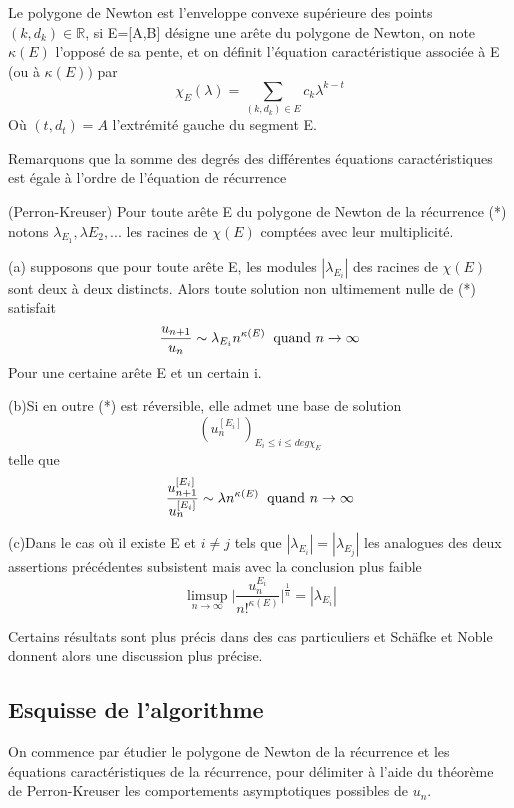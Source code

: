 \documentclass[a4paper,10.5pt]{article}
\begin{document}
	
	\begin{definition} Le polygone de Newton est l'enveloppe convexe supérieure des points $(k, d_{k}) \in \mathbb{R}$, si E=[A,B] désigne une arête du polygone de Newton, on note $\kappa(E)$ l'opposé de sa pente, et on définit l'équation caractéristique associée à E (ou à $\kappa(E))$ par
		\[\chi_{E}(\lambda)=\sum_{(k,d_{k}) \in E} c_{k}\lambda^{k-t}\]
		Où $(t,d_{t})=A$ l'extrémité gauche du segment E.
	\end{definition}
	
	Remarquons que la somme des degrés des différentes équations caractéristiques est égale à l'ordre de l'équation de récurrence 
	
	\begin{theorem} (Perron-Kreuser)
		Pour toute arête E du polygone de Newton de la récurrence (*) notons $\lambda_{E_{1}},\lambda{E_{2}},...$ les racines de $\chi(E)$ comptées avec leur multiplicité.
		
		(a) supposons que pour toute arête E, les modules $|\lambda_{E_{i}}|$ des racines de $\chi(E)$ sont deux à deux distincts. Alors toute solution non ultimement nulle de (*) satisfait
		\[\frac{u_{n+1}}{u_{n}}\sim \lambda_{E_{i}}n^{\kappa(E)} \hspace{2mm} \text{quand } n \rightarrow \infty\]
		Pour une certaine arête E et un certain i.
		
		(b)Si en outre (*) est réversible, elle admet une base de solution 
		\[(u_{n}^{[E_{i}]})_{E_{i}\leq i \leq deg \chi_{E}}\]
		telle que 
		\[\frac{u_{n+1}^{[E_{i}]}}{u_{n}^{[E_{i}]}}\sim \lambda n^{\kappa(E)} \hspace{2mm} \text{quand } n \rightarrow \infty\]
		
		(c)Dans le cas où il existe E et $i \neq j$ tels que $|\lambda_{E_{i}}|=|\lambda_{E_{j}}|$ les analogues des deux assertions précédentes subsistent mais avec la conclusion plus faible
		\[\limsup_{n \rightarrow \infty } \big|\frac{u_{n}^{E_{i}}}{n!^{\kappa(E)}}\big|^{\frac{1}{n}}=|\lambda_{E_{i}}|\]
	\end{theorem}
	
	Certains résultats sont plus précis dans des cas particuliers et Schäfke et Noble donnent alors une discussion plus précise.
	
	\subsection{Esquisse de l'algorithme}
	
	On commence par étudier le polygone de Newton de la récurrence et les équations caractéristiques de la récurrence, pour délimiter à l'aide du théorème de Perron-Kreuser les comportements asymptotiques possibles de $u_{n}$.
	
\end{document}
